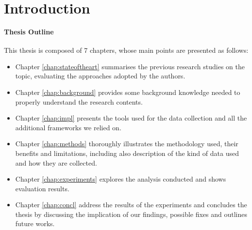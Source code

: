 \chapter{Introduction}
\label{chap:intro}


\subsubsection*{Thesis Outline}
\label{subsec:outline}

This thesis is composed of 7 chapters, whose main points are presented as follows:
\begin{itemize}
	\item Chapter \ref{chap:stateoftheart} summarises the previous research 
	studies on the topic, evaluating the approaches adopted by the authors.
	
	\item Chapter \ref{chap:background} provides some background knowledge 
	needed to properly understand the research contents.
	
	\item Chapter \ref{chap:impl} presents the tools used for the data collection 
	and all the additional frameworks we relied on.
		
	\item Chapter \ref{chap:methods} thoroughly illustrates the methodology used, 
	their benefits and limitations, including also description of the kind of data 
	used and how they are collected. 

	\item Chapter \ref{chap:experiments} explores the analysis conducted and 
	shows evaluation results.	
	
	\item Chapter \ref{chap:concl} address the results of the experiments and 
	concludes the thesis by discussing the implication of our findings, possible fixes 
	and outlines future works.
	
\end{itemize}

